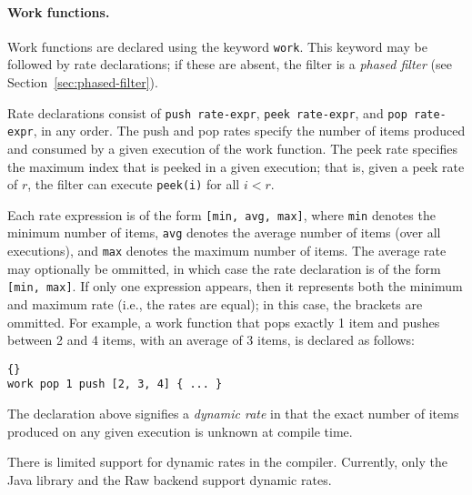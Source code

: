\documentclass[11pt]{article}
\begin{document}
\paragraph{Work functions.}  Work functions are declared using the
keyword \lstinline|work|.  This keyword may be followed by rate
declarations; if these are absent, the filter is a \emph{phased
filter} (see Section~\ref{sec:phased-filter}).  

Rate declarations consist of \lstinline|push rate-expr|,
\lstinline|peek rate-expr|, and \lstinline|pop rate-expr|,
in any order.  The push and pop rates specify the number of items
produced and consumed by a given execution of the work function.  The
peek rate specifies the maximum index that is peeked in a given
execution; that is, given a peek rate of $r$, the filter can execute
\lstinline|peek(i)| for all $i < r$.

Each rate expression is of the form \lstinline|[min, avg, max]|, where
\lstinline|min| denotes the minimum number of items, \lstinline|avg|
denotes the average number of items (over all executions), and
\lstinline|max| denotes the maximum number of items.  The average rate
may optionally be ommitted, in which case the rate declaration is of
the form \lstinline|[min, max]|.  If only one expression appears, then
it represents both the minimum and maximum rate (i.e., the rates are
equal); in this case, the brackets are ommitted.  For example, a work
function that pops exactly 1 item and pushes between 2 and 4 items,
with an average of 3 items, is declared as follows:

\begin{lstlisting}{}
work pop 1 push [2, 3, 4] { ... }
\end{lstlisting}

The declaration above signifies a {\it dynamic rate} in that the exact
number of items produced on any given execution is unknown at compile
time.  

\begin{note}
There is limited support for dynamic rates in the compiler.
Currently, only the Java library and the Raw backend support dynamic
rates.
\end{note}
\end{document}
